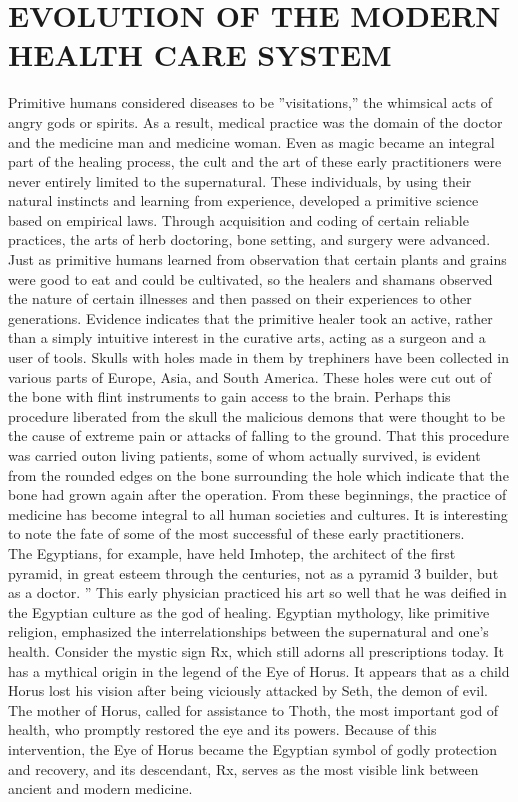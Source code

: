 \documentclass[12pt]{article}
\begin{document}
\section{EVOLUTION OF THE MODERN HEALTH CARE SYSTEM
}
Primitive humans considered diseases to be ''visitations,'' the whimsical acts of angry gods or spirits.
As a result, medical practice was the domain of the doctor and the medicine man and medicine woman.
Even as magic became an integral part of the healing process, the cult and the art of these early practitioners were never entirely limited to the supernatural.
These individuals, by using their natural instincts and learning from experience, developed a primitive science based on empirical laws.
Through acquisition and coding of certain reliable practices, the arts of herb doctoring, bone setting, and surgery  were advanced.
Just as primitive humans learned from observation that certain plants and grains were good to eat and could be cultivated, so the healers and shamans observed the nature of certain illnesses and then passed on their experiences to other generations.
Evidence indicates that the primitive healer took an active, rather than a simply intuitive interest in the curative arts, acting as a surgeon and a user of tools.
Skulls with holes made in them by trephiners have been collected in various parts of Europe, Asia, and South America.
These holes were cut out of the bone with flint instruments to gain access to the brain.
Perhaps this procedure liberated from the skull the malicious demons that were thought to be the cause of extreme pain or attacks of falling to the ground.
That this procedure was carried outon living patients, some of whom actually survived, is evident from the rounded edges on the bone surrounding the hole which indicate that the bone had grown again after the operation.
From these beginnings, the practice of medicine has become integral to all human societies and cultures.
It is interesting to note the fate of some of the most successful of these early practitioners.\\


\>  The Egyptians, for example, have held Imhotep, the architect of the first pyramid, in great esteem through the centuries, not as a pyramid 3 builder, but as a doctor.
'' This early physician practiced his art so well that he was deified in the Egyptian culture as the god of healing.
Egyptian mythology, like primitive religion, emphasized the interrelationships between the supernatural and one's health.
Consider the mystic sign Rx, which still adorns all prescriptions today.
It has a mythical origin in the legend of the Eye of Horus.
It appears that as a child Horus lost his vision after being viciously attacked by Seth, the demon of evil.
The mother of Horus, called for assistance to Thoth, the most important god of health, who promptly restored the eye and its powers.
Because of this intervention, the Eye of Horus became the Egyptian symbol of godly protection and recovery, and its descendant, Rx, serves as the most visible link between ancient and modern medicine.\\
\end{document}
